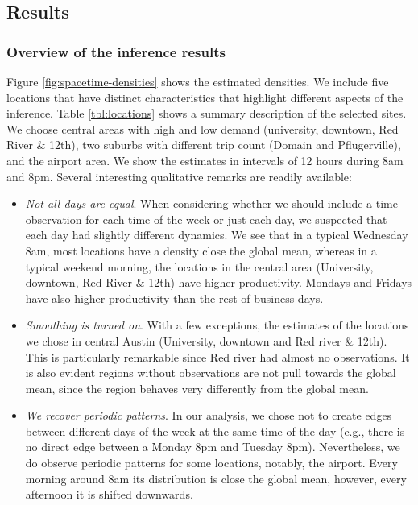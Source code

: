 \documentclass[11pt]{article}
\begin{document}
\subsection{Results}

\subsubsection{Overview of the inference results}

Figure \ref{fig:spacetime-densities} shows the estimated densities. We include five locations that have distinct characteristics that highlight different aspects of the inference. Table \ref{tbl:locations} shows a summary description of the selected sites. We choose central areas with high and low demand (university, downtown, Red River \& 12th), two suburbs with different trip count (Domain and Pflugerville), and the airport area. We show the estimates in intervals of 12 hours during 8am and 8pm. Several interesting qualitative remarks are readily available:

\begin{itemize}
    \item \textit{Not all days are equal}. When considering whether we should include a time observation for each time of the week or just each day, we suspected that each day had slightly different dynamics. We see that in a typical Wednesday 8am, most locations have a density close the global mean, whereas in a typical weekend morning, the locations in the central area (University, downtown, Red River \& 12th) have higher productivity. Mondays and Fridays have also higher productivity than the rest of business days. 
    \item \textit{Smoothing is turned on}. With a few exceptions, the estimates of the locations we chose in central Austin (University, downtown and Red river \& 12th). This is particularly remarkable since Red river had almost no observations. It is also evident regions without observations are not pull towards the global mean, since the region behaves very differently from the global mean.
    \item \textit{We recover periodic patterns}. In our analysis, we chose not to create edges between different days of the week at the same time of the day (e.g., there is no direct edge between a Monday 8pm and Tuesday 8pm). Nevertheless, we do observe periodic patterns for some locations, notably, the airport. Every morning around 8am its distribution is close the global mean, however, every afternoon it is shifted downwards.
\end{itemize}
\end{document}
